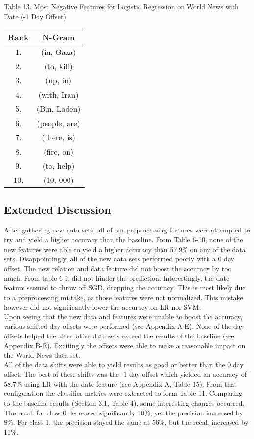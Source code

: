 \documentclass[11pt,a4paper]{article}
\begin{document}
\begin{center}
Table 13. Most Negative Features for Logistic Regression on World News with Date (-1 Day Offset)\\
\begin{tabular}{ |c|c| }
 \hline
 Rank & N-Gram\\
 \hline
 1. & (in, Gaza)\\
 2. & (to, kill)\\
 3. & (up, in)\\
 4. & (with, Iran)\\
 5. & (Bin, Laden)\\
 6. & (people, are)\\
 7. & (there, is)\\
 8. & (fire, on)\\
 9. & (to, help)\\
 10. & (10, 000)\\
 \hline
\end{tabular}
\end{center}



\subsection{Extended Discussion}
After gathering new data sets, all of our preprocessing features were attempted to try and yield a higher accuracy than the baseline. From Table 6-10, none of the new features were able to yield a higher accuracy than 57.9\% on any of the data sets. Disappointingly, all of the new data sets performed poorly with a 0 day offset. The new relation and data feature did not boost the accuracy by too much. From table 6 it did not hinder the prediction. Interestingly, the date feature seemed to throw off SGD, dropping the accuracy. This is most likely due to a preprocessing mistake, as those features were not normalized. This mistake however did not significantly lower the accuracy on LR nor SVM.\\

Upon seeing that the new data and features were unable to boost the accuracy, various shifted day offsets were performed (see Appendix A-E). None of the day offsets helped the alternative data sets exceed the results of the baseline (see Appendix B-E). Excitingly the offsets were able to make a reasonable impact on the World News data set.\\

All of the data shifts were able to yield results as good or better than the 0 day offset. The best of these shifts was the -1 day offset which yielded an accuracy of 58.7\% using LR with the date feature (see Appendix A, Table 15). From that configuration the classifier metrics were extracted to form Table 11. Comparing to the baseline results (Section 3.1, Table 4), some interesting changes occurred. The recall for class 0 decreased significantly 10\%, yet the precision increased by 8\%. For class 1, the precision stayed the same at 56\%, but the recall increased by 11\%.\\
\end{document}
